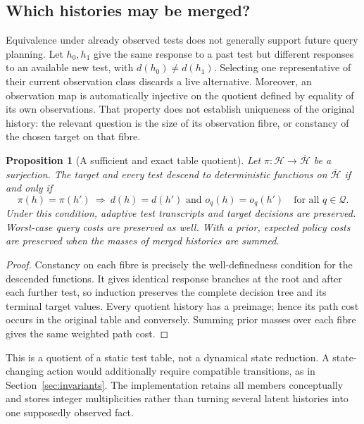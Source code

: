 \documentclass[11pt,a4paper]{article}
\newtheorem{proposition}[theorem]{Proposition}
\theoremstyle{definition}\newtheorem{definition}[theorem]{Definition}
\begin{document}
\subsection{Which histories may be merged?}
Equivalence under already observed tests does not generally support future query planning. Let $h_0,h_1$ give the same response to a past test but different responses to an available new test, with $d(h_0)\ne d(h_1)$. Selecting one representative of their current observation class discards a live alternative. Moreover, an observation map is automatically injective on the quotient defined by equality of its own observations. That property does not establish uniqueness of the original history: the relevant question is the size of its observation fibre, or constancy of the chosen target on that fibre.

\begin{proposition}[A sufficient and exact table quotient]\label{prop:tablequotient}
Let $\pi:\mathcal H\to\overline{\mathcal H}$ be a surjection. The target and every test descend to deterministic functions on $\overline{\mathcal H}$ if and only if
\begin{equation}
 \pi(h)=\pi(h')\ \Longrightarrow\ d(h)=d(h')\text{ and }o_q(h)=o_q(h')
 \quad\text{for all }q\in\mathcal Q. \label{eq:queryquotient}
\end{equation}
Under this condition, adaptive test transcripts and target decisions are preserved. Worst-case query costs are preserved as well. With a prior, expected policy costs are preserved when the masses of merged histories are summed.
\end{proposition}
\begin{proof}
Constancy on each fibre is precisely the well-definedness condition for the descended functions. It gives identical response branches at the root and after each further test, so induction preserves the complete decision tree and its terminal target values. Every quotient history has a preimage; hence its path cost occurs in the original table and conversely. Summing prior masses over each fibre gives the same weighted path cost.
\end{proof}

This is a quotient of a static test table, not a dynamical state reduction. A state-changing action would additionally require compatible transitions, as in Section~\ref{sec:invariants}. The implementation retains all members conceptually and stores integer multiplicities rather than turning several latent histories into one supposedly observed fact.
\end{document}
